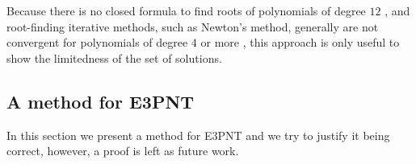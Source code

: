 Because there is no closed formula to find roots of polynomials of degree $12$ \cite{skopenkov2015}, and root-finding iterative methods, such as Newton's method, generally are not convergent for polynomials of degree $4$ or more \cite{mc1}, this approach is only useful to show the limitedness of the set of solutions.

\subsection{A method for E3PNT}

In this section we present a method for E3PNT and we try to justify it being correct, however, a proof is left as future work.

